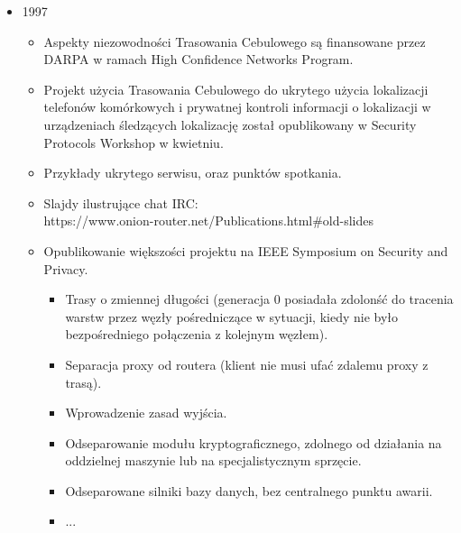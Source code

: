 \begin{itemize}
  \item 1997
  \begin{itemize}
   \item Aspekty niezowodności Trasowania Cebulowego są finansowane przez DARPA w ramach High Confidence Networks Program.
   \item Projekt użycia Trasowania Cebulowego do ukrytego użycia lokalizacji telefonów komórkowych i prywatnej kontroli informacji o lokalizacji w urządzeniach śledzących lokalizację został opublikowany w Security Protocols Workshop w kwietniu.
   \item Przykłady ukrytego serwisu, oraz punktów spotkania.
   \item Slajdy ilustrujące chat IRC: \\https://www.onion-router.net/Publications.html\#old-slides
   \item Opublikowanie większości projektu na IEEE Symposium on Security and Privacy.
   \begin{itemize}
    \item Trasy o zmiennej długości (generacja 0 posiadała zdolonść do tracenia warstw przez węzły pośredniczące w sytuacji, kiedy nie było bezpośredniego połączenia z kolejnym węzłem).
    \item Separacja proxy od routera (klient nie musi ufać zdalemu proxy z trasą). 
    \item Wprowadzenie zasad wyjścia.
    \item Odseparowanie modułu kryptograficznego, zdolnego od działania na oddzielnej maszynie lub na specjalistycznym sprzęcie.
    \item Odseparowane silniki bazy danych, bez centralnego punktu awarii.
    \item ...
   \end{itemize}
  \end{itemize}
  

\end{itemize}
